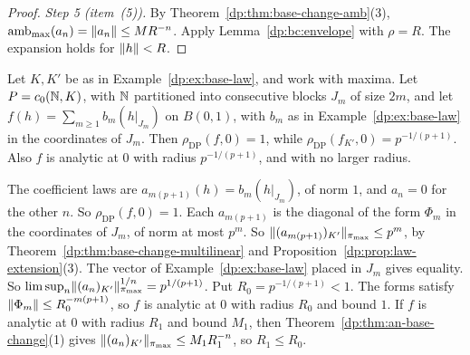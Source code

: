 \begin{proof}
\emph{Step 5 (item~(5)).} By Theorem~\ref{dp:thm:base-change-amb}(3), $\operatorname{amb}_{\max}(a_n)=\lVert a_n\rVert\le MR^{-n}$. Apply Lemma~\ref{dp:bc:envelope} with $\rho=R$. The expansion holds for $\lVert h\rVert<R$.
\end{proof}

\begin{example}\label{dp:ex:base-radius}
Let $K,K'$ be as in Example~\ref{dp:ex:base-law}, and work with maxima. Let $P=c_0(\mathbb N,K)$, with $\mathbb N$ partitioned into consecutive blocks $J_m$ of size $2m$, and let $f(h)=\sum_{m\ge1}b_m(h|_{J_m})$ on $B(0,1)$, with $b_m$ as in Example~\ref{dp:ex:base-law} in the coordinates of $J_m$. Then $\rho_{\mathrm{DP}}(f,0)=1$, while $\rho_{\mathrm{DP}}(f_{K'},0)=p^{-1/(p+1)}$. Also $f$ is analytic at $0$ with radius $p^{-1/(p+1)}$, and with no larger radius.

The coefficient laws are $a_{m(p+1)}(h)=b_m(h|_{J_m})$, of norm $1$, and $a_n=0$ for the other $n$. So $\rho_{\mathrm{DP}}(f,0)=1$. Each $a_{m(p+1)}$ is the diagonal of the form $\Phi_m$ in the coordinates of $J_m$, of norm at most $p^m$. So $\lVert (a_{m(p+1)})_{K'}\rVert_{\pi_{\max}}\le p^m$, by Theorem~\ref{dp:thm:base-change-multilinear} and Proposition~\ref{dp:prop:law-extension}(3). The vector of Example~\ref{dp:ex:base-law} placed in $J_m$ gives equality. So $\limsup_n\lVert (a_n)_{K'}\rVert_{\pi_{\max}}^{1/n}=p^{1/(p+1)}$. Put $R_0=p^{-1/(p+1)}<1$. The forms satisfy $\lVert \Phi_m\rVert\le R_0^{-m(p+1)}$, so $f$ is analytic at $0$ with radius $R_0$ and bound $1$. If $f$ is analytic at $0$ with radius $R_1$ and bound $M_1$, then Theorem~\ref{dp:thm:an-base-change}(1) gives $\lVert (a_n)_{K'}\rVert_{\pi_{\max}}\le M_1R_1^{-n}$, so $R_1\le R_0$.
\end{example}
